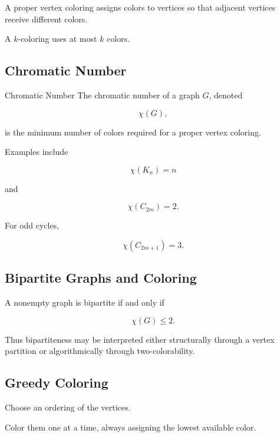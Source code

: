 A proper vertex coloring assigns colors to vertices so that adjacent
vertices receive different colors.

A \(k\)-coloring uses at most \(k\) colors.

\subsection{Chromatic Number}
\label{subsec:chromatic-number}

\begin{definitionbox}{Chromatic Number}
The chromatic number of a graph \(G\), denoted

\[
\boxed{
\chi(G),
}
\]

is the minimum number of colors required for a proper vertex coloring.
\end{definitionbox}

Examples include

\[
\chi(K_n)=n
\]

and

\[
\chi(C_{2m})=2.
\]

For odd cycles,

\[
\boxed{
\chi(C_{2m+1})=3.
}
\]

\subsection{Bipartite Graphs and Coloring}
\label{subsec:bipartite-coloring}

A nonempty graph is bipartite if and only if

\[
\boxed{
\chi(G)\leq2.
}
\]

Thus bipartiteness may be interpreted either structurally through a
vertex partition or algorithmically through two-colorability.

\subsection{Greedy Coloring}
\label{subsec:greedy-coloring}

Choose an ordering of the vertices.

Color them one at a time, always assigning the lowest available color.

